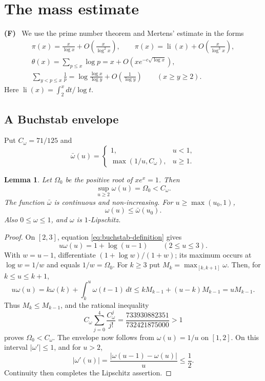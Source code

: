 \documentclass{amsart}
\newtheorem{lemma}{Lemma}[section]
\newcounter{fact}
\renewcommand{\thefact}{F\arabic{fact}}
\newenvironment{fact}{\refstepcounter{fact}\par\medskip
\noindent\textbf{(\thefact)}\ }{\par\medskip}
\numberwithin{equation}{section}
\numberwithin{table}{section}
\begin{document}
\section{The mass estimate}\label{sec:mass}

\begin{fact}\label{fact:PNT}
\cite[Chapters~7 and~18]{Da} We use the prime number theorem and Mertens'
estimate in the forms
\begin{gather*}
\pi(x)=\frac{x}{\log x}+O\left(\frac{x}{\log^2x}\right),\qquad
\pi(x)=\operatorname{li}(x)+O\left(\frac{x}{\log^3x}\right),\\
\theta(x)=\sum_{p\le x}\log p=x+O(xe^{-c\sqrt{\log x}}),\\
\sum_{y<p\le x}\frac1p
=\log\frac{\log x}{\log y}+O\left(\frac1{\log y}\right)
\qquad(x\ge y\ge2).
\end{gather*}
Here $\operatorname{li}(x)=\int_2^xdt/\log t$.
\end{fact}

\subsection{A Buchstab envelope}

Put $C_\omega=71/125$ and
\begin{equation}\label{eq:omega-envelope}
\bar\omega(u)=
\begin{cases}
1,&u<1,\\
\max(1/u,C_\omega),&u\ge1.
\end{cases}
\end{equation}

\begin{lemma}\label{lem:omega-envelope}
Let $\Omega_0$ be the positive root of $xe^x=1$. Then
\[
\sup_{u\ge2}\omega(u)=\Omega_0<C_\omega.
\]
The function $\bar\omega$ is continuous and non-increasing.
For $u\ge\max(u_0,1)$,
\[
\omega(u)\le\bar\omega(u_0).
\]
Also $0\le\omega\le1$, and $\omega$ is $1$-Lipschitz.
\end{lemma}

\begin{proof}
On $[2,3]$, equation \eqref{eq:buchstab-definition} gives
\[
u\omega(u)=1+\log(u-1)\qquad(2\le u\le3).
\]
With $w=u-1$, differentiate $(1+\log w)/(1+w)$; its maximum occurs at
$\log w=1/w$ and equals $1/w=\Omega_0$.
For $k\ge3$ put $M_k=\max_{[k,k+1]}\omega$. Then, for $k\le u\le k+1$,
\[
u\omega(u)=k\omega(k)+\int_k^u\omega(t-1)\,dt
\le kM_{k-1}+(u-k)M_{k-1}=uM_{k-1}.
\]
Thus $M_k\le M_{k-1}$, and the rational inequality
\begin{equation}\label{eq:omega-rational}
C_\omega\sum_{j=0}^4\frac{C_\omega^j}{j!}
=\frac{733930882351}{732421875000}>1
\end{equation}
proves $\Omega_0<C_\omega$.
The envelope now follows from $\omega(u)=1/u$ on $[1,2]$.
On this interval $|\omega'|\le1$, and for $u>2$,
\[
|\omega'(u)|=\frac{|\omega(u-1)-\omega(u)|}{u}\le\frac12.
\]
Continuity then completes the Lipschitz assertion.
\end{proof}
\end{document}
